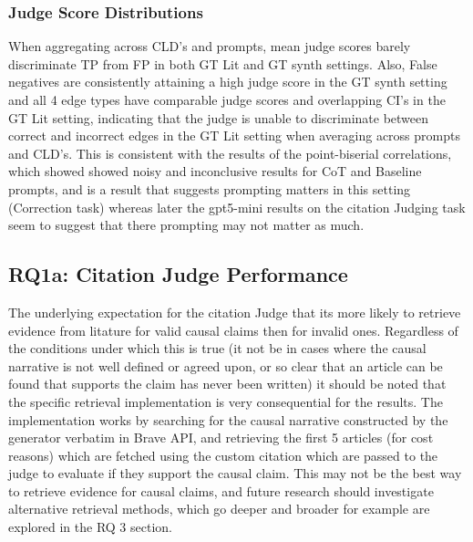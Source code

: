 \subsubsection{Judge Score Distributions}

When aggregating across CLD's and prompts, mean judge scores barely discriminate TP from FP in both GT Lit and GT synth settings. Also, False negatives are consistently attaining a high judge score in the GT synth setting and all 4 edge types have comparable judge scores and overlapping CI's in the GT Lit setting, indicating that the judge is unable to discriminate between correct and incorrect edges in the GT Lit setting when averaging across prompts and CLD's. This is consistent with the results of the point-biserial correlations, which showed showed noisy and inconclusive results for CoT and Baseline prompts, and is a result that suggests prompting matters in this setting (Correction task) whereas later the gpt5-mini results on the citation Judging task seem to suggest that there prompting may not matter as much.
\subsection{RQ1a: Citation Judge Performance}
\label{sec:discussion_rq1a_citation}

The underlying expectation for the citation Judge that its more likely to retrieve evidence from litature for valid causal claims then for invalid ones. 
Regardless of the conditions under which this is true (it not be in cases where the causal narrative is not well defined or agreed upon, or so clear that an article can be found that supports the claim has never been written) it should be noted that the specific retrieval implementation is very consequential for the results. The implementation works by searching for the causal narrative constructed by the generator verbatim in Brave API, and retrieving the first 5 articles (for cost reasons) which are fetched using the custom citation which are passed to the judge to evaluate if they support the causal claim. This may not be the best way to retrieve evidence for causal claims, and future research should investigate alternative retrieval methods, which go deeper and broader for example are explored in the RQ 3 section.

